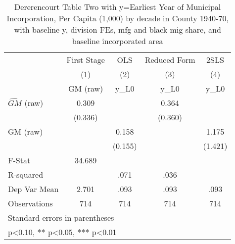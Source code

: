 \begin{table}[htbp]\centering
\def\sym#1{\ifmmode^{#1}\else\(^{#1}\)\fi}
\caption{Dererencourt Table Two with y=Earliest Year of Municipal Incorporation, Per Capita (1,000) by decade in County 1940-70, with baseline y, division FEs, mfg and black mig share, and baseline incorporated area}
\begin{tabular}{l*{4}{c}}
\toprule
                    & First Stage   &         OLS   &Reduced Form   &        2SLS   \\
                    &\multicolumn{1}{c}{(1)}&\multicolumn{1}{c}{(2)}&\multicolumn{1}{c}{(3)}&\multicolumn{1}{c}{(4)}\\
                    &\multicolumn{1}{c}{GM  (raw)}&\multicolumn{1}{c}{y\_L0}&\multicolumn{1}{c}{y\_L0}&\multicolumn{1}{c}{y\_L0}\\
\midrule
$\hat{GM}$ (raw)    &       0.309   &               &       0.364   &               \\
                    &     (0.336)   &               &     (0.360)   &               \\
\addlinespace
GM  (raw)           &               &       0.158   &               &       1.175   \\
                    &               &     (0.155)   &               &     (1.421)   \\
\midrule
F-Stat              &      34.689   &               &               &               \\
R-squared           &               &        .071   &        .036   &               \\
Dep Var Mean        &       2.701   &        .093   &        .093   &        .093   \\
Observations        &         714   &         714   &         714   &         714   \\
\bottomrule
\multicolumn{5}{l}{\footnotesize Standard errors in parentheses}\\
\multicolumn{5}{l}{\footnotesize * p<0.10, ** p<0.05, *** p<0.01}\\
\end{tabular}
\end{table}
